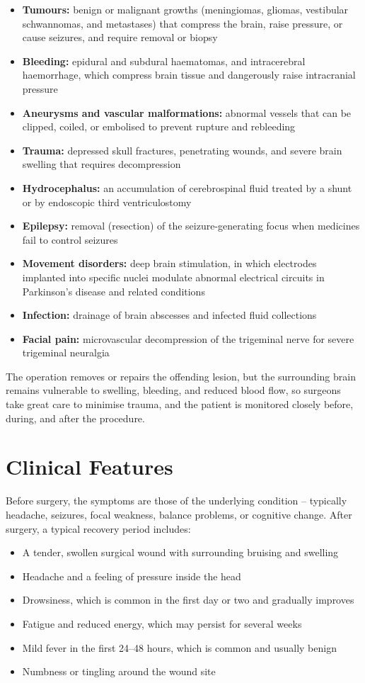 \begin{itemize}
    \item \textbf{Tumours:} benign or malignant growths (meningiomas, gliomas, vestibular schwannomas, and metastases) that compress the brain, raise pressure, or cause seizures, and require removal or biopsy
    \item \textbf{Bleeding:} epidural and subdural haematomas, and intracerebral haemorrhage, which compress brain tissue and dangerously raise intracranial pressure
    \item \textbf{Aneurysms and vascular malformations:} abnormal vessels that can be clipped, coiled, or embolised to prevent rupture and rebleeding
    \item \textbf{Trauma:} depressed skull fractures, penetrating wounds, and severe brain swelling that requires decompression
    \item \textbf{Hydrocephalus:} an accumulation of cerebrospinal fluid treated by a shunt or by endoscopic third ventriculostomy
    \item \textbf{Epilepsy:} removal (resection) of the seizure-generating focus when medicines fail to control seizures
    \item \textbf{Movement disorders:} deep brain stimulation, in which electrodes implanted into specific nuclei modulate abnormal electrical circuits in Parkinson's disease and related conditions
    \item \textbf{Infection:} drainage of brain abscesses and infected fluid collections
    \item \textbf{Facial pain:} microvascular decompression of the trigeminal nerve for severe trigeminal neuralgia
\end{itemize}

The operation removes or repairs the offending lesion, but the surrounding brain remains vulnerable to swelling, bleeding, and reduced blood flow, so surgeons take great care to minimise trauma, and the patient is monitored closely before, during, and after the procedure.

\section*{Clinical Features}
Before surgery, the symptoms are those of the underlying condition -- typically headache, seizures, focal weakness, balance problems, or cognitive change. After surgery, a typical recovery period includes:

\begin{itemize}
    \item A tender, swollen surgical wound with surrounding bruising and swelling
    \item Headache and a feeling of pressure inside the head
    \item Drowsiness, which is common in the first day or two and gradually improves
    \item Fatigue and reduced energy, which may persist for several weeks
    \item Mild fever in the first 24--48 hours, which is common and usually benign
    \item Numbness or tingling around the wound site
\end{itemize}

